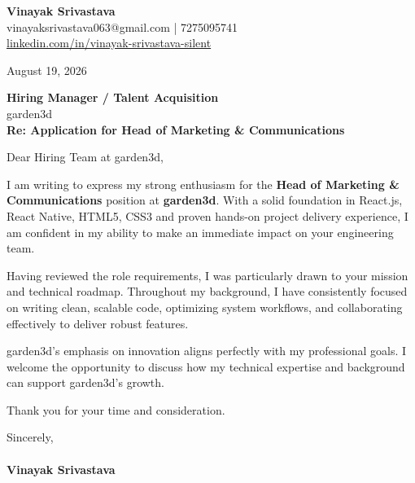 \documentclass[11pt,a4paper]{article}
\begin{document}
\thispagestyle{empty}

{\Large \textbf{Vinayak Srivastava}}\\
vinayaksrivastava063@gmail.com | 7275095741 \\
\url{linkedin.com/in/vinayak-srivastava-silent}

\vspace{1em}
\hfill August 19, 2026

\textbf{Hiring Manager / Talent Acquisition}\\
garden3d\\

\vspace{1.5em}
\textbf{Re: Application for Head of Marketing & Communications}

\vspace{1em}
Dear Hiring Team at garden3d,

I am writing to express my strong enthusiasm for the \textbf{Head of Marketing & Communications} position at \textbf{garden3d}. With a solid foundation in React.js, React Native, HTML5, CSS3 and proven hands-on project delivery experience, I am confident in my ability to make an immediate impact on your engineering team.

Having reviewed the role requirements, I was particularly drawn to your mission and technical roadmap. Throughout my background, I have consistently focused on writing clean, scalable code, optimizing system workflows, and collaborating effectively to deliver robust features.

garden3d's emphasis on innovation aligns perfectly with my professional goals. I welcome the opportunity to discuss how my technical expertise and background can support garden3d's growth.

Thank you for your time and consideration.

\vspace{1.5em}
Sincerely,\\
\vspace{1em}\\
\textbf{Vinayak Srivastava}
\end{document}
